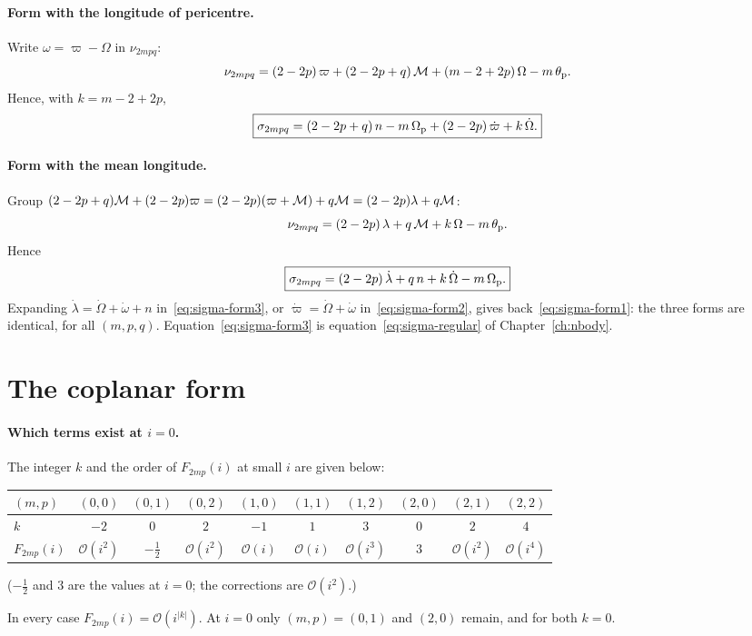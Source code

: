 \paragraph{Form with the longitude of pericentre.} Write $\omega=\varpi-\Omega$ in $\nu_{2mpq}$:
\[
  \nu_{2mpq}=(2-2p)\,\varpi+(2-2p+q)\,\mathcal{M}+(m-2+2p)\,\Omega-m\,\theta_{\mathrm p} .
\]
Hence, with $k=m-2+2p$,
\begin{equation}
  \boxed{\sigma_{2mpq}=(2-2p+q)\,n-m\,\Omega_{\mathrm p}+(2-2p)\,\dot\varpi+k\,\dot\Omega.} \label{eq:sigma-form2}
\end{equation}

\paragraph{Form with the mean longitude.} Group $(2-2p+q)\mathcal{M}+(2-2p)\varpi=(2-2p)(\varpi+\mathcal{M})+q\mathcal{M}=(2-2p)\lambda+q\mathcal{M}$:
\[
  \nu_{2mpq}=(2-2p)\,\lambda+q\,\mathcal{M}+k\,\Omega-m\,\theta_{\mathrm p} .
\]
Hence
\begin{equation}
  \boxed{\sigma_{2mpq}=(2-2p)\,\dot\lambda+q\,n+k\,\dot\Omega-m\,\Omega_{\mathrm p}.} \label{eq:sigma-form3}
\end{equation}
Expanding $\dot\lambda=\dot\Omega+\dot\omega+n$ in~\eqref{eq:sigma-form3}, or $\dot\varpi=\dot\Omega+\dot\omega$ in~\eqref{eq:sigma-form2}, gives back~\eqref{eq:sigma-form1}: the three forms are identical, for all $(m,p,q)$. Equation~\eqref{eq:sigma-form3} is equation~\eqref{eq:sigma-regular} of Chapter~\ref{ch:nbody}.

\section{The coplanar form}
\paragraph{Which terms exist at $i=0$.} The integer $k$ and the order of $F_{2mp}(i)$ at small $i$ are given below:
\begin{center}\small
\setlength{\tabcolsep}{3pt}
\begin{tabular}{l|ccc|ccc|ccc}\toprule
$(m,p)$ & $(0,0)$ & $(0,1)$ & $(0,2)$ & $(1,0)$ & $(1,1)$ & $(1,2)$ & $(2,0)$ & $(2,1)$ & $(2,2)$\\\midrule
$k$ & $-2$ & $0$ & $2$ & $-1$ & $1$ & $3$ & $0$ & $2$ & $4$\\
$F_{2mp}(i)$ & $\mathcal O(i^2)$ & $-\tfrac12$ & $\mathcal O(i^2)$ & $\mathcal O(i)$ & $\mathcal O(i)$ & $\mathcal O(i^3)$ & $3$ & $\mathcal O(i^2)$ & $\mathcal O(i^4)$\\\bottomrule
\end{tabular}

\smallskip
($-\tfrac12$ and $3$ are the values at $i=0$; the corrections are $\mathcal O(i^2)$.)
\end{center}
In every case $F_{2mp}(i)=\mathcal O(i^{|k|})$. At $i=0$ only $(m,p)=(0,1)$ and $(2,0)$ remain, and for both $k=0$.

